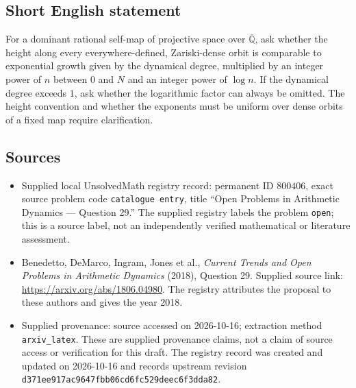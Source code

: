\documentclass[11pt]{article}
\newcommand{\Q}{\mathbb{Q}}
\begin{document}
\subsection{Short English statement}
For a dominant rational self-map of projective space over \(\overline{\Q}\), ask whether the height along every everywhere-defined, Zariski-dense orbit is comparable to exponential growth given by the dynamical degree, multiplied by an integer power of \(n\) between \(0\) and \(N\) and an integer power of \(\log n\). If the dynamical degree exceeds \(1\), ask whether the logarithmic factor can always be omitted. The height convention and whether the exponents must be uniform over dense orbits of a fixed map require clarification.
\subsection{Sources}
\begin{itemize}
\item Supplied local UnsolvedMath registry record: permanent ID \(800406\), exact source problem code \texttt{catalogue entry}, title ``Open Problems in Arithmetic Dynamics --- Question 29.'' The supplied registry labels the problem \texttt{open}; this is a source label, not an independently verified mathematical or literature assessment.
\item Benedetto, DeMarco, Ingram, Jones et al., \emph{Current Trends and Open Problems in Arithmetic Dynamics} (2018), Question 29. Supplied source link: \url{https://arxiv.org/abs/1806.04980}. The registry attributes the proposal to these authors and gives the year 2018.
\item Supplied provenance: source accessed on 2026-10-16; extraction method \texttt{arxiv\_latex}. These are supplied provenance claims, not a claim of source access or verification for this draft. The registry record was created and updated on 2026-10-16 and records upstream revision \texttt{d371ee917ac9647fbb06cd6fc529deec6f3dda82}.
\end{itemize}
\end{document}
